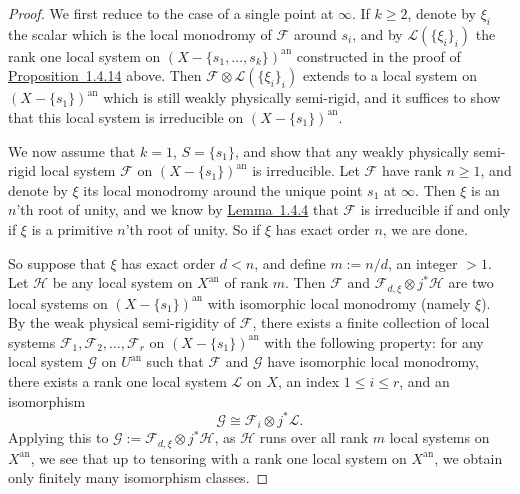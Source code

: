 \begin{proof}
We first reduce to the case of a single point at \(\infty\). If \(k\geq 2\),
denote by \(\xi_i\) the scalar which is the local monodromy of \(\mathcal{F}\)
around \(s_i\), and by \(\mathcal{L}(\{\xi_i\}_i)\) the rank one local system
on \((X-\{s_1,\ldots,s_k\})^{\mathrm{an}}\) constructed in the proof of
\hyperref[prop:1.4.14]{Proposition~1.4.14}
above. Then \(\mathcal{F}\otimes\mathcal{L}(\{\xi_i\}_i)\) extends to a local
system on \((X-\{s_1\})^{\mathrm{an}}\) which is still weakly physically
semi-rigid, and it suffices to show that this local system is irreducible on
\((X-\{s_1\})^{\mathrm{an}}\).

We now assume that \(k=1\), \(S=\{s_1\}\), and show that any weakly physically
semi-rigid local system \(\mathcal{F}\) on \((X-\{s_1\})^{\mathrm{an}}\) is
irreducible. Let \(\mathcal{F}\) have rank \(n\geq 1\), and denote by \(\xi\)
its local monodromy around the unique point \(s_1\) at \(\infty\). Then \(\xi\)
is an \(n\)'th root of unity, and we know by
\hyperref[lem:1.4.4]{Lemma~1.4.4} that \(\mathcal{F}\) is
irreducible if and only if \(\xi\) is a primitive \(n\)'th root of unity. So if
\(\xi\) has exact order \(n\), we are done.

So suppose that \(\xi\) has exact order \(d<n\), and define \(m:=n/d\), an
integer \(>1\). Let \(\mathcal{H}\) be any local system on \(X^{\mathrm{an}}\)
of rank \(m\). Then \(\mathcal{F}\) and
\(\mathcal{F}_{d,\xi}\otimes j^*\mathcal{H}\) are two local systems on
\((X-\{s_1\})^{\mathrm{an}}\) with isomorphic local monodromy (namely \(\xi\)).
By the weak physical semi-rigidity of \(\mathcal{F}\), there exists a finite
collection of local systems \(\mathcal{F}_1,\mathcal{F}_2,\ldots,\mathcal{F}_r\)
on \((X-\{s_1\})^{\mathrm{an}}\) with the following property: for any local
system \(\mathcal{G}\) on \(U^{\mathrm{an}}\) such that \(\mathcal{F}\) and
\(\mathcal{G}\) have isomorphic local monodromy, there exists a rank one local
system \(\mathcal{L}\) on \(X\), an index \(1\leq i\leq r\), and an isomorphism
\[
  \mathcal{G}\cong \mathcal{F}_i\otimes j^*\mathcal{L}.
\]
Applying this to
\(\mathcal{G}:=\mathcal{F}_{d,\xi}\otimes j^*\mathcal{H}\), as
\(\mathcal{H}\) runs over all rank \(m\) local systems on \(X^{\mathrm{an}}\),
we see that up to tensoring with a rank one local system on \(X^{\mathrm{an}}\),
we obtain only finitely many isomorphism classes.


\end{proof}
